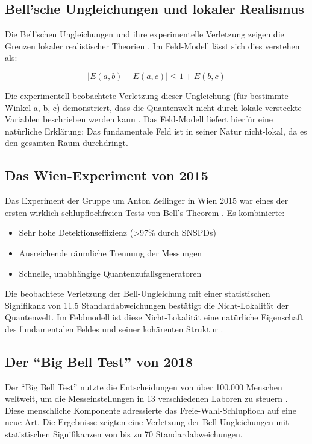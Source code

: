 \documentclass[a4paper,12pt]{article}
\begin{document}
	\subsection{Bell'sche Ungleichungen und lokaler Realismus}
	
	Die Bell'schen Ungleichungen und ihre experimentelle Verletzung zeigen die Grenzen lokaler realistischer Theorien \cite{Bell1964}. Im Feld-Modell lässt sich dies verstehen als:
	
	\begin{equation}
		|E(a,b) - E(a,c)| \leq 1 + E(b,c)
	\end{equation}
	
	Die experimentell beobachtete Verletzung dieser Ungleichung (für bestimmte Winkel a, b, c) demonstriert, dass die Quantenwelt nicht durch lokale versteckte Variablen beschrieben werden kann \cite{Aspect1982}. Das Feld-Modell liefert hierfür eine natürliche Erklärung: Das fundamentale Feld ist in seiner Natur nicht-lokal, da es den gesamten Raum durchdringt.
	
	\subsection{Das Wien-Experiment von 2015}
	
	Das Experiment der Gruppe um Anton Zeilinger in Wien 2015 war eines der ersten wirklich schlupflochfreien Tests von Bell's Theorem \cite{Giustina2015}. Es kombinierte:
	\begin{itemize}
		\item Sehr hohe Detektionseffizienz (>97\% durch SNSPDs)
		\item Ausreichende räumliche Trennung der Messungen
		\item Schnelle, unabhängige Quantenzufallsgeneratoren
	\end{itemize}
	
	Die beobachtete Verletzung der Bell-Ungleichung mit einer statistischen Signifikanz von 11.5 Standardabweichungen bestätigt die Nicht-Lokalität der Quantenwelt. Im Feldmodell ist diese Nicht-Lokalität eine natürliche Eigenschaft des fundamentalen Feldes und seiner kohärenten Struktur \cite{Zeilinger2010}.
	
	\subsection{Der ``Big Bell Test'' von 2018}
	
	Der ``Big Bell Test'' nutzte die Entscheidungen von über 100.000 Menschen weltweit, um die Messeinstellungen in 13 verschiedenen Laboren zu steuern \cite{BigBellTest2018}. Diese menschliche Komponente adressierte das Freie-Wahl-Schlupfloch auf eine neue Art. Die Ergebnisse zeigten eine Verletzung der Bell-Ungleichungen mit statistischen Signifikanzen von bis zu 70 Standardabweichungen.
	
\end{document}
